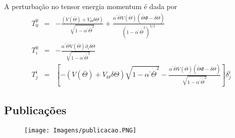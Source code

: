 \documentclass[
	12pt,				%
	openright,			%
	oneside,			%
	a4paper,			%
	english,			%
	french,				%
	spanish,			%
	brazil				%
	]{abntex2}
\begin{document}
\begin{apendicesenv}
A perturbação no tensor energia momentum é dada por
\begin{eqnarray}\label{A11}
T_{0}^{0} &=& - \frac{(V(\bar{\Theta})+V_{\Theta}\delta\Theta)}{\sqrt{1-\alpha^{\prime}\dot{\bar{\Theta}}^{2}}}+\frac{\alpha^{\prime}\dot{\bar{\Theta}}V(\bar{\Theta})(\dot{\bar{\Theta}}\Phi - \dot{\delta\Theta})}{(1-\alpha^{\prime}\dot{\bar{\Theta}}^{2})^{3/2}}\nonumber\\
T_{i}^{0} &=& -\frac{\alpha^{\prime}\dot{\bar{\Theta}}V(\bar{\Theta})\partial_{i}\delta\Theta}{\sqrt{1-\alpha^{\prime}\dot{\bar{\Theta}}^{2}}}\\
T_{j}^{i} &=& \left[-(V(\bar{\Theta})+V_{\Theta}\delta\Theta)\sqrt{1-\alpha^{\prime}\dot{\bar{\Theta}}^{2}}-\frac{\alpha^{\prime}\dot{\bar{\Theta}}V(\bar{\Theta})(\dot{\bar{\Theta}}\Phi - \dot{\delta\Theta})}{\sqrt{1-\alpha^{\prime}\dot{\bar{\Theta}}^{2}}}\right]\delta_{j}^{i}\nonumber
\end{eqnarray}
%

\end{apendicesenv}



\begin{anexosenv}

\partanexos

\chapter{Publicações}
%
\begin{figure}[!ht]
\centering
\texttt{[image: Imagens/publicacao.PNG]}
\label{fig8.1}
\end{figure}
%
%
%

\end{anexosenv}

\printindex
\end{document}
